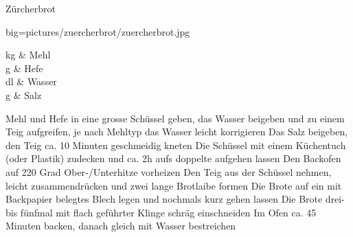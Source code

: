 \begin{recipe}
	[ 
	preparationtime = {\unit[120]{min}},
	bakingtime = {\unit[45]{min}},
	bakingtemperature={\protect\bakingtemperature{fanoven=\unit[220]{°C}}},
	portion = 2 Brote,
	calory
	]
	{Zürcherbrot}
	
	\graph
	{
		big=pictures/zuercherbrot/zuercherbrot.jpg
	}
	
	\ingredients
	{
		\unit[1]{kg} & Mehl \\
		\unit[30]{g} & Hefe \\
		\unit[7]{dl} & Wasser \\
		\unit[20]{g} & Salz
	}
	
	\preparation
	{%
		\step Mehl und Hefe in eine grosse Schüssel geben, das Wasser beigeben und zu einem Teig aufgreifen, je nach Mehltyp das Wasser leicht korrigieren
		\step Das Salz beigeben, den Teig ca. 10 Minuten geschmeidig kneten
		\step Die Schüssel mit einem Küchentuch (oder Plastik) zudecken und ca. 2h aufs doppelte aufgehen lassen
		\step Den Backofen auf 220 Grad Ober-/Unterhitze vorheizen
		\step Den Teig aus der Schüssel nehmen, leicht zusammendrücken und zwei lange Brotlaibe formen
		\step Die Brote auf ein mit Backpapier belegtes Blech legen und nochmals kurz gehen lassen		
		\step Die Brote drei- bis fünfmal mit flach geführter Klinge schräg einschneiden
		\step Im Ofen ca. 45 Minuten backen, danach gleich mit Wasser bestreichen
	}
	
\end{recipe}